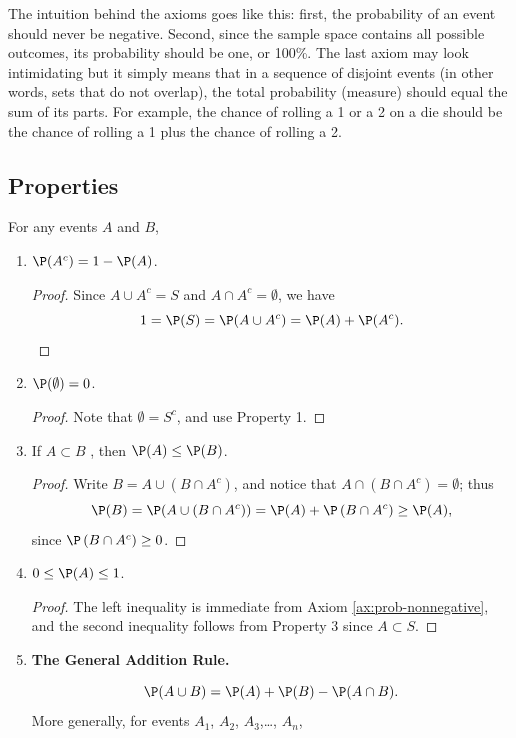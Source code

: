 \documentclass[captions=tableheading]{scrbook}
\begin{document}
The intuition behind the axioms goes like this: first, the probability of an event should never be negative. Second, since the sample space contains all possible outcomes, its probability should be one, or 100\%. The last axiom may look intimidating but it simply means that in a sequence of disjoint events (in other words, sets that do not overlap), the total probability (measure) should equal the sum of its parts. For example, the chance of rolling a 1 or a 2 on a die should be the chance of rolling a 1 plus the chance of rolling a 2.
\subsection{Properties}
\label{sec-4-4-2}


For any events \(A\) and \(B\),

\begin{enumerate}
\item \(\P(A^{c})=1-\P(A)\).\label{enu:prop-prob-complement} 

  \begin{proof}
  Since \(A\cup A^{c}=S\) and \(A\cap A^{c}=\emptyset\), we have
  \[
  1=\P(S)=\P(A\cup A^{c})=\P(A)+\P(A^{c}).
  \]
  \end{proof}
\item \(\P(\emptyset)=0\).

  \begin{proof}
  Note that \(\emptyset=S^{c}\), and use Property 1.
  \end{proof}
\item If \(A\subset B\) , then \(\P(A)\leq\P(B)\).

  \begin{proof}
  Write \(B=A\cup\left(B\cap A^{c}\right)\), and notice that \(A\cap\left(B\cap A^{c}\right)=\emptyset\); thus
  \[
  \P(B)=\P(A\cup\left(B\cap A^{c}\right))=\P(A)+\P\left(B\cap A^{c}\right)\geq\P(A),
  \]
  since \(\P\left(B\cap A^{c}\right)\ge0\). 
  \end{proof}
\item \(0\leq\P(A)\leq1\).

  \begin{proof}
  The left inequality is immediate from Axiom \ref{ax:prob-nonnegative}, and the second inequality follows from Property 3 since \(A\subset S\).
  \end{proof}
\item \textbf{The General Addition Rule.}

  \begin{equation}
  \P(A\cup B)=\P(A)+\P(B)-\P(A\cap B).\label{eq:general-addition-rule-1}
  \end{equation}
  More generally, for events \(A_{1}\), \(A_{2}\), \(A_{3}\),\ldots{}, \(A_{n}\),


\end{enumerate}
\end{document}
